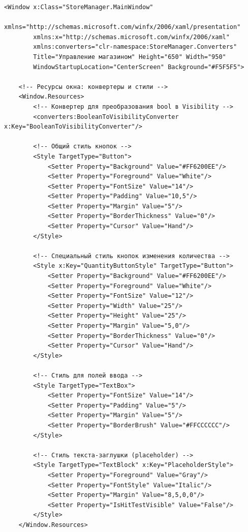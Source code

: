 \documentclass[12pt]{article}
\newcommand{\colorGIT}[1]{\textcolor{CtpGreen}{#1}}
\begin{document}
\begin{lstlisting}[style=csharp_catppuccin, caption=Пример разметки главного окна \colorGIT{\href{https://github.com/WebMasterIT/Csharp_Labs/blob/ec375afd16c0647b337cf3d8a79c8bef904fc1be/3lab/StoreManager/MainWindow.xaml\#L1-L200}{MainWindow}}, label=lst:MainWindow, basicstyle=\tiny]
<Window x:Class="StoreManager.MainWindow"
        xmlns="http://schemas.microsoft.com/winfx/2006/xaml/presentation"
        xmlns:x="http://schemas.microsoft.com/winfx/2006/xaml"
        xmlns:converters="clr-namespace:StoreManager.Converters"
        Title="Управление магазином" Height="650" Width="950"
        WindowStartupLocation="CenterScreen" Background="#F5F5F5">

    <!-- Ресурсы окна: конвертеры и стили -->
    <Window.Resources>
        <!-- Конвертер для преобразования bool в Visibility -->
        <converters:BooleanToVisibilityConverter x:Key="BooleanToVisibilityConverter"/>

        <!-- Общий стиль кнопок -->
        <Style TargetType="Button">
            <Setter Property="Background" Value="#FF6200EE"/>
            <Setter Property="Foreground" Value="White"/>
            <Setter Property="FontSize" Value="14"/>
            <Setter Property="Padding" Value="10,5"/>
            <Setter Property="Margin" Value="5"/>
            <Setter Property="BorderThickness" Value="0"/>
            <Setter Property="Cursor" Value="Hand"/>
        </Style>

        <!-- Специальный стиль кнопок изменения количества -->
        <Style x:Key="QuantityButtonStyle" TargetType="Button">
            <Setter Property="Background" Value="#FF6200EE"/>
            <Setter Property="Foreground" Value="White"/>
            <Setter Property="FontSize" Value="12"/>
            <Setter Property="Width" Value="25"/>
            <Setter Property="Height" Value="25"/>
            <Setter Property="Margin" Value="5,0"/>
            <Setter Property="BorderThickness" Value="0"/>
            <Setter Property="Cursor" Value="Hand"/>
        </Style>

        <!-- Стиль для полей ввода -->
        <Style TargetType="TextBox">
            <Setter Property="FontSize" Value="14"/>
            <Setter Property="Padding" Value="5"/>
            <Setter Property="Margin" Value="5"/>
            <Setter Property="BorderBrush" Value="#FFCCCCCC"/>
        </Style>

        <!-- Стиль текста-заглушки (placeholder) -->
        <Style TargetType="TextBlock" x:Key="PlaceholderStyle">
            <Setter Property="Foreground" Value="Gray"/>
            <Setter Property="FontStyle" Value="Italic"/>
            <Setter Property="Margin" Value="8,5,0,0"/>
            <Setter Property="IsHitTestVisible" Value="False"/>
        </Style>
    </Window.Resources>


\end{lstlisting}
\end{document}
